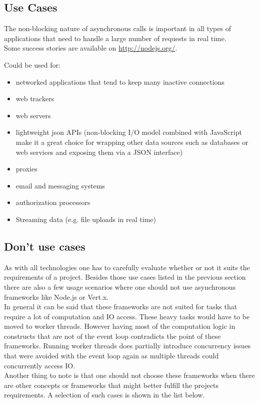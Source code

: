 \subsection{Use Cases}
\label{use_cases}
The non-blocking nature of asynchronous calls is important in all types of
applications that need to handle a large number of requests in real time.\\
Some success stories are available on \url{http://nodejs.org/}.

Could be used for: 
\begin{itemize}
  \item networked applications that tend to keep many inactive connections
  \item web trackers
  \item web servers
  \item lightweight json APIs (non-blocking I/O model 
  		combined with JavaScript make it a great choice for
  		wrapping other data sources such as databases or web 
  		services and exposing them via a JSON interface)%
  \item proxies
  \item email and messaging systems
  \item authorization processors
  \item Streaming data (e.g. file uploads in real time)
\end{itemize}

\subsection{Don't use cases}
\label{dont_use_cases}


As with all technologies one has to carefully evaluate whether or not it suits the
requirements of a project. Besides those use cases listed in the previous
section there are also a few usage scenarios where one should not use
asynchronous frameworks like Node.js or Vert.x.\\
In general it can be said that these frameworks are not suited for tasks that
require a lot of computation and IO access. These heavy tasks would have to be
moved to worker threads. However having most of the computation logic in
constructs that are not of the event loop contradicts the point of these
frameworks. Running worker threads does partially introduce concurrency issues that were
avoided with the event loop again as multiple threads could concurrently access IO.\\
Another thing to note is that one should not choose these frameworks when
there are other concepts or frameworks that might better fulfill the 
projects requirements.
A selection of such cases is shown in the list below. 

